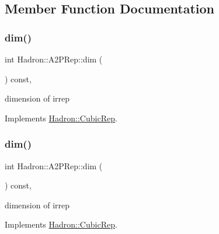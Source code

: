 \subsection{Member Function Documentation}
\mbox{\label{structHadron_1_1A2PRep_a04bb56baff4cef639545dcbaa73e8414}} 
\subsubsection{\texorpdfstring{dim()}{dim()}\hspace{0.1cm}{\footnotesize\ttfamily [1/3]}}
{\footnotesize\ttfamily int Hadron\+::\+A2\+P\+Rep\+::dim (\begin{DoxyParamCaption}{ }\end{DoxyParamCaption}) const\hspace{0.3cm}{\ttfamily [inline]}, {\ttfamily [virtual]}}

dimension of irrep 

Implements \mbox{\hyperlink{structHadron_1_1CubicRep_ac178d14064f037a66af4b9fb4b312d51}{Hadron\+::\+Cubic\+Rep}}.

\mbox{\label{structHadron_1_1A2PRep_a04bb56baff4cef639545dcbaa73e8414}} 
\subsubsection{\texorpdfstring{dim()}{dim()}\hspace{0.1cm}{\footnotesize\ttfamily [2/3]}}
{\footnotesize\ttfamily int Hadron\+::\+A2\+P\+Rep\+::dim (\begin{DoxyParamCaption}{ }\end{DoxyParamCaption}) const\hspace{0.3cm}{\ttfamily [inline]}, {\ttfamily [virtual]}}

dimension of irrep 

Implements \mbox{\hyperlink{structHadron_1_1CubicRep_ac178d14064f037a66af4b9fb4b312d51}{Hadron\+::\+Cubic\+Rep}}.

\mbox{\label{structHadron_1_1A2PRep_a04bb56baff4cef639545dcbaa73e8414}} 
